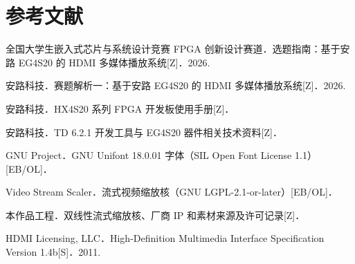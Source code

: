 \section{参考文献}
\begin{enumerate}[label={[\arabic*]}]
\item 全国大学生嵌入式芯片与系统设计竞赛 FPGA 创新设计赛道．选题指南：基于安路 EG4S20 的 HDMI 多媒体播放系统[Z]．2026.
\item 安路科技．赛题解析一：基于安路 EG4S20 的 HDMI 多媒体播放系统[Z]．2026.
\item 安路科技．HX4S20 系列 FPGA 开发板使用手册[Z]．
\item 安路科技．TD 6.2.1 开发工具与 EG4S20 器件相关技术资料[Z]．
\item GNU Project．GNU Unifont 18.0.01 字体（SIL Open Font License 1.1）[EB/OL]．
\item Video Stream Scaler．流式视频缩放核（GNU LGPL-2.1-or-later）[EB/OL]．
\item 本作品工程．双线性流式缩放核、厂商 IP 和素材来源及许可记录[Z]．
\item HDMI Licensing, LLC．High-Definition Multimedia Interface Specification Version 1.4b[S]．2011.
\end{enumerate}
